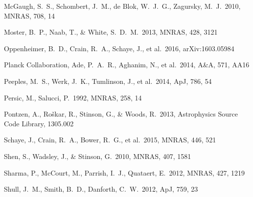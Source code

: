 \documentclass[useAMS,usenatbib]{mn2e}
\def \apj {ApJ}
\def \mnras {MNRAS}
\def \aap {A\&A}
\begin{document}
\begin{thebibliography}{}
 McGaugh, S.~S., 
Schombert, J.~M., de Blok, W.~J.~G., Zagursky, M.~J.\ 2010, \mnras,
708, 14

 Moster, B.~P., Naab, T., 
\& White, S.~D.~M.\ 2013, \mnras, 428, 3121 





%
 Oppenheimer, B.~D., Crain, R.~A., Schaye, J., et al.\ 2016, arXiv:1603.05984


  Planck Collaboration, Ade, P.~A.~R., Aghanim, N., et al.\ 2014,
  \aap, 571, AA16 
 
 Peeples, M.~S., Werk, J.~K., Tumlinson, J., et al.\ 2014, \apj, 786, 54

 Persic, M., Salucci, P.\ 1992, \mnras, 258, 14

 Pontzen, A., Ro{\v s}kar, R., Stinson, G., \& Woods, R.\ 2013, Astrophysics Source Code Library, 1305.002 





 Schaye, J., Crain,
  R.~A., Bower, R.~G., et al.\ 2015, \mnras, 446, 521

  
 Shen, S., Wadsley, J., 
\& Stinson, G.\ 2010, \mnras, 407, 1581 

Sharma, P., McCourt, M., Parrish, I.~J., Quataert, E.\ 2012, \mnras, 427, 1219

Shull, J.~M., Smith, B.~D., Danforth, C.~W.\ 2012, \apj, 759, 23


\end{thebibliography}
\end{document}
